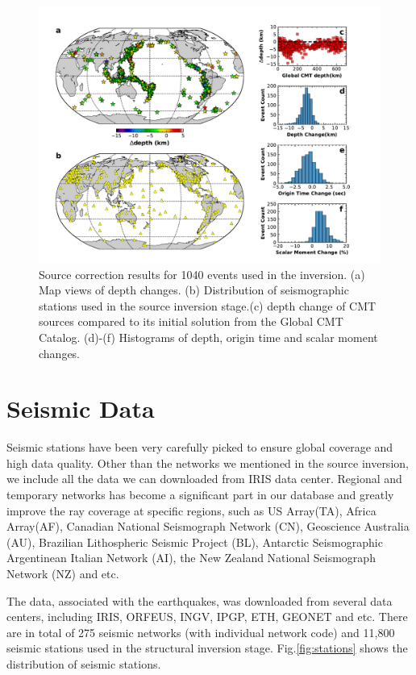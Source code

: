 \documentclass[extra,mreferee]{gji}
\begin{document}
\begin{figure}
  \centering
  \includegraphics[width=\textwidth]{figures/source_corrections.pdf}
  \caption{Source correction results for 1040 events used in the inversion. (a) Map views of depth changes. (b) Distribution of seismographic stations used in the source inversion stage.(c) depth change of CMT sources compared to its initial solution from the Global CMT Catalog. (d)-(f) Histograms of depth, origin time and scalar moment changes.}
  \label{fig:source_correction}
\end{figure}

\section{Seismic Data}

Seismic stations have been very carefully picked to ensure global coverage and high data quality.
Other than the networks we mentioned in the source inversion, we include all the data we can
downloaded from IRIS data center. Regional and temporary networks has become a significant part
in our database and greatly improve the ray coverage at specific regions, such as US Array(TA),
Africa Array(AF), Canadian National Seismograph Network (CN), Geoscience Australia (AU),
Brazilian Lithospheric Seismic Project (BL),
Antarctic Seismographic Argentinean Italian Network (AI),
the New Zealand National Seismograph Network (NZ) and etc.

The data, associated with the earthquakes, was downloaded from several data centers,
including IRIS, ORFEUS, INGV, IPGP, ETH, GEONET and etc.
There are in total of 275 seismic networks (with individual network code) and 11,800
seismic stations used in the structural inversion stage. Fig.\ref{fig:stations}
shows the distribution of seismic stations.
\end{document}

